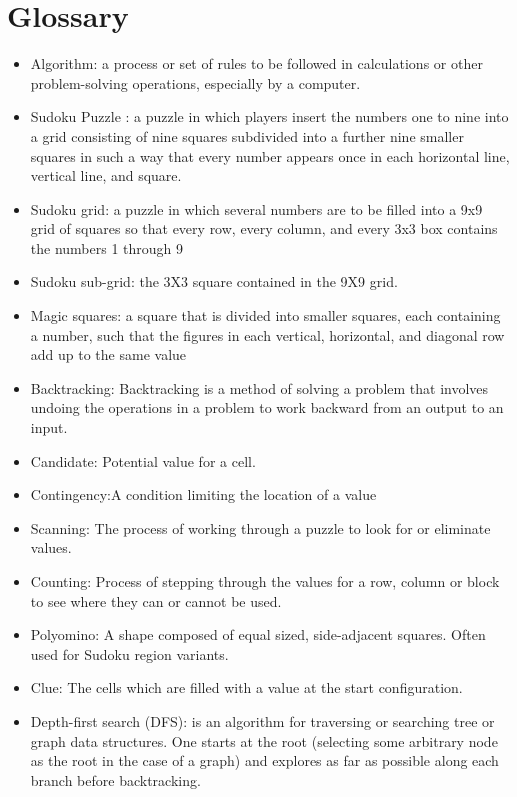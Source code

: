 \documentclass[12pt]{article}
\begin{document}
\section{Glossary}
\begin{itemize}
\item Algorithm: a process or set of rules to be followed in calculations or other problem-solving operations, especially by a computer.
\item Sudoku Puzzle : a puzzle in which players insert the numbers one to nine into a grid consisting of nine squares subdivided into a further nine smaller squares in such a way that every number appears once in each horizontal line, vertical line, and square.
\item Sudoku grid:  a puzzle in which several numbers are to be filled into a 9x9 grid of squares so that every row, every column, and every 3x3 box contains the numbers 1 through 9
\item Sudoku sub-grid: the 3X3 square contained in the 9X9 grid.
\item Magic squares: a square that is divided into smaller squares, each containing a number, such that the figures in each vertical, horizontal, and diagonal row add up to the same value
\item Backtracking: Backtracking is a method of solving a problem that involves undoing the operations in a problem to work backward from an output to an input.
\item Candidate: Potential value for a cell.
\item Contingency:A condition limiting the location of a value
\item Scanning: The process of working through a puzzle to look for or eliminate values.
\item Counting: Process of stepping through the values for a row, column or block to see where they can or cannot be used.
\item Polyomino:
A shape composed of equal sized, side-adjacent squares. Often used for Sudoku region variants.
\item Clue: The cells which are filled with a value at the start configuration.
\item Depth-first search (DFS): is an algorithm for traversing or searching tree or graph data structures. One starts at the root (selecting some arbitrary node as the root in the case of a graph) and explores as far as possible along each branch before backtracking.

\end{itemize}
\end{document}

